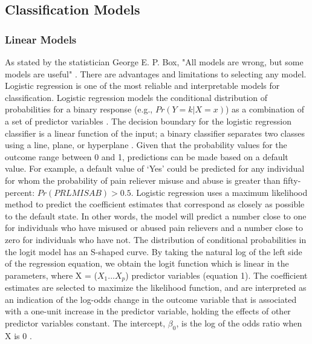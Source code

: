 \documentclass[sigconf]{acmart}
\begin{document}

\subsection{Classification Models}

\subsubsection{Linear Models}

As stated by the statistician George E. P. Box, "All models are wrong, but 
some models are useful" \cite{box05}. There are advantages and limitations 
to selecting any model. Logistic regression is one of the most reliable 
and interpretable models for classification. Logistic regression models 
the conditional distribution of probabilities for a binary response 
(e.g., $Pr(Y=k|X=x)$) as a combination of a set of predictor variables 
\cite{james13, raschka17}. The decision boundary for the logistic regression 
classifier is a linear function of the input; a binary classifier separates 
two classes using a line, plane, or hyperplane \cite{muller17}. Given that 
the probability values for the outcome range between 0 and 1, predictions 
can be made based on a default value. For example, a default value of `Yes' 
could be predicted for any individual for whom the probability of pain reliever
misuse and abuse is greater than fifty-percent: $Pr(PRLMISAB) > 0.5$. 
Logistic regression uses a maximum likelihood method to predict the coefficient
estimates that correspond as closely as possible to the default state. 
In other words, the model will predict a number close to one for individuals 
who have misused or abused pain relievers and a number close to  zero for 
individuals who have not. The distribution of conditional probabilities in 
the logit model has an S-shaped curve. By taking the natural log of the left 
side of the regression equation, we obtain the logit function which is linear 
in the parameters, where X = ($X_1$...$X_p$) predictor variables (equation 1). 
The coefficient estimates are selected to maximize the likelihood function, 
and are interpreted as an indication of the log-odds change in the outcome 
variable that is associated with a one-unit increase in the predictor variable, 
holding the effects of other predictor variables constant. The intercept, 
$\beta_0$, is the log of the odds ratio when X is 0 \cite{gujarati09}.
\end{document}

